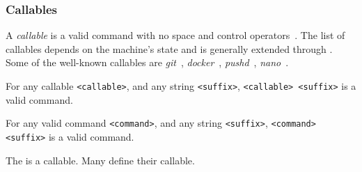\subsubsection{Callables}\label{callables}

A \emph{callable} is a valid command with no space and control operators~\cite{control_operators}. The list of callables depends on the machine's state and is generally extended through . Some of the well-known callables are \emph{git}~\cite{git}, \emph{docker}~\cite{docker}, \emph{pushd}~\cite{pushd}, \emph{nano}~\cite{nano}. 

\begin{theorem}
For any callable \texttt{<callable>}, and any string \texttt{<suffix>}, \texttt{<callable> <suffix>} is a valid command.
\end{theorem}

\begin{theorem}
For any valid command \texttt{<command>}, and any string \texttt{<suffix>}, \texttt{<command> <suffix>} is a valid command.
\end{theorem}

The  is a callable. Many  define their callable. 